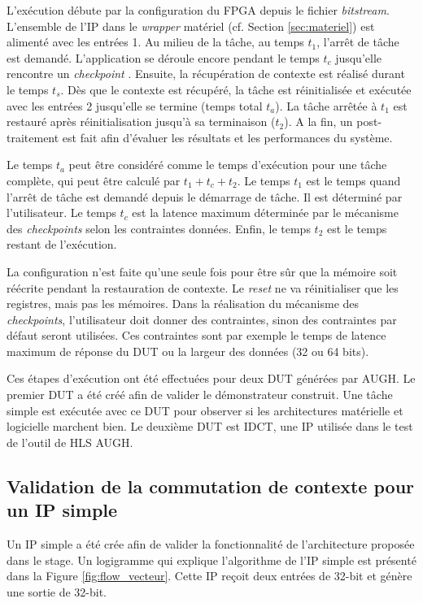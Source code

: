 L'exécution débute par la configuration du FPGA depuis le fichier \emph{bitstream}. L'ensemble de l'IP
dans le \emph{wrapper} matériel (cf. Section \ref{sec:materiel}) est alimenté avec les entrées 1.
Au milieu de la tâche, au temps $t_1$, l'arrêt de tâche est demandé. L'application se déroule encore
pendant le temps $t_c$ jusqu'elle rencontre
un \emph{checkpoint} . Ensuite, la récupération de contexte est réalisé durant le temps
$t_s$. Dès que le contexte est récupéré, la tâche est réinitialisée et exécutée avec les entrées 2 jusqu'elle se termine (temps total $t_a$).
La tâche arrêtée à $t_1$ est restauré après réinitialisation jusqu'à sa terminaison ($t_2$). 
A la fin, un post-traitement est fait afin d'évaluer les résultats et les performances du système.

Le temps $t_a$ peut être considéré comme le temps d'exécution pour une tâche complète,
qui peut être calculé par $t_1 + t_c + t_2$. Le temps $t_1$ est le temps quand l'arrêt de tâche est demandé
depuis le démarrage de tâche. Il est déterminé par l'utilisateur. Le temps $t_c$ est la latence maximum déterminée
par le mécanisme des \emph{checkpoints} selon les contraintes données. Enfin, le temps $t_2$ est
le temps restant de l'exécution.

La configuration n'est faite qu'une seule fois pour être sûr que la mémoire soit réécrite pendant la restauration
de contexte. Le \emph{reset} ne va réinitialiser que les registres, mais pas les mémoires.
Dans la réalisation du mécanisme des \emph{checkpoints}, l'utilisateur doit donner des contraintes,
sinon des contraintes par défaut seront utilisées. Ces contraintes sont par exemple le temps de latence maximum de réponse du DUT ou
la largeur des données (32 ou 64 bits).

Ces étapes d'exécution ont été effectuées pour deux DUT générées par AUGH. Le premier DUT a été créé
afin de valider le démonstrateur construit. Une tâche simple est exécutée avec ce DUT pour observer
si les architectures matérielle et logicielle marchent bien. Le deuxième DUT est IDCT, une IP utilisée
dans le test de l'outil de HLS AUGH.

\subsection{Validation de la commutation de contexte pour un IP simple}

Un IP simple a été crée afin de valider la fonctionnalité de 
l'architecture proposée dans le stage. Un logigramme qui explique l'algorithme de l'IP simple est présenté dans la Figure
\ref{fig:flow_vecteur}. Cette IP reçoit deux entrées de 32-bit et génère une sortie de 32-bit.

